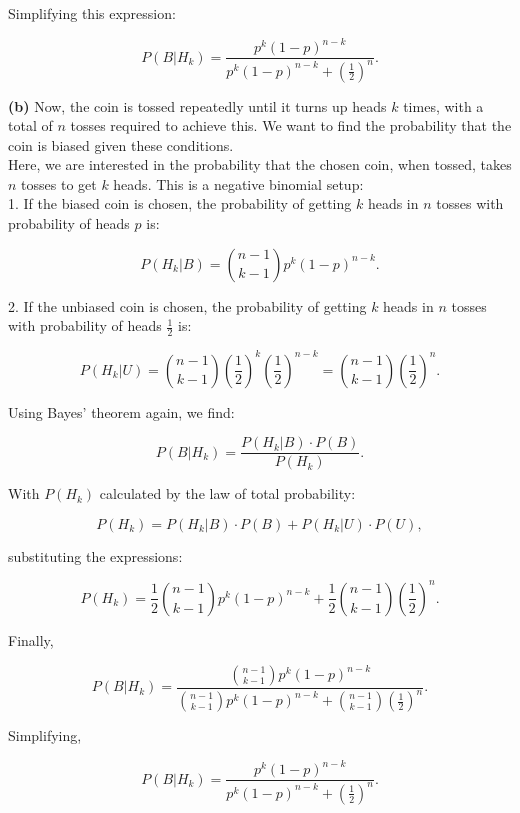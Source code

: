 \begin{solution}
    Simplifying this expression:
    
    \[
    P(B | H_k) = \frac{p^k (1 - p)^{n - k}}{p^k (1 - p)^{n - k} + \left( \frac{1}{2} \right)^n}.
    \]
    
    
    \textbf{(b)} Now, the coin is tossed repeatedly until it turns up heads \( k \) times, with a total of \( n \) tosses required to achieve this. We want to find the probability that the coin is biased given these conditions.\\
    
    Here, we are interested in the probability that the chosen coin, when tossed, takes \( n \) tosses to get \( k \) heads. This is a negative binomial setup:\\
    
    1. If the biased coin is chosen, the probability of getting \( k \) heads in \( n \) tosses with probability of heads \( p \) is:
    
       \[
       P(H_k | B) = \binom{n-1}{k-1} p^k (1 - p)^{n - k}.
       \]
    
    2. If the unbiased coin is chosen, the probability of getting \( k \) heads in \( n \) tosses with probability of heads \( \frac{1}{2} \) is:
    
       \[
       P(H_k | U) = \binom{n-1}{k-1} \left( \frac{1}{2} \right)^k \left( \frac{1}{2} \right)^{n - k} = \binom{n-1}{k-1} \left( \frac{1}{2} \right)^n.
       \]
    
    Using Bayes' theorem again, we find:
    
    \[
    P(B | H_k) = \frac{P(H_k | B) \cdot P(B)}{P(H_k)}.
    \]
    
    With \( P(H_k) \) calculated by the law of total probability:
    
    \[
    P(H_k) = P(H_k | B) \cdot P(B) + P(H_k | U) \cdot P(U),
    \]
    
    substituting the expressions:
    
    \[
    P(H_k) = \frac{1}{2} \binom{n-1}{k-1} p^k (1 - p)^{n - k} + \frac{1}{2} \binom{n-1}{k-1} \left( \frac{1}{2} \right)^n.
    \]
    
    Finally,
    
    \[
    P(B | H_k) = \frac{\binom{n-1}{k-1} p^k (1 - p)^{n - k}}{\binom{n-1}{k-1} p^k (1 - p)^{n - k} + \binom{n-1}{k-1} \left( \frac{1}{2} \right)^n}.
    \]
    
    Simplifying,
    
    \[
    P(B | H_k) = \frac{p^k (1 - p)^{n - k}}{p^k (1 - p)^{n - k} + \left( \frac{1}{2} \right)^n}.
    \]    
\end{solution}

